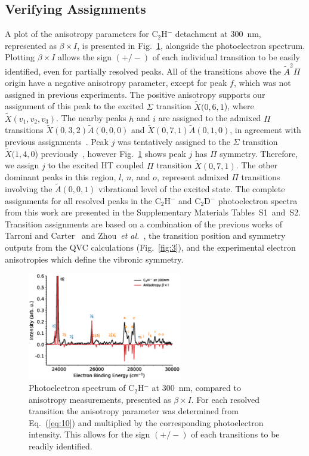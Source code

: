 \documentclass[aip,graphicx]{revtex4-1}
\begin{document}
\subsection{Verifying Assignments}
A plot of the anisotropy parameters for C$_2$H$^-$ detachment at 300~nm, represented as $\beta\times I$, is presented in Fig.~\ref{fig:6}, alongside the photoelectron spectrum. Plotting $\beta\times I$ allows the sign $(+/-)$ of each individual transition to be easily identified, even for partially resolved peaks. All of the transitions above the $\tilde{A} ^2\Pi$ origin have a negative anisotropy parameter, except for peak $f$, which was not assigned in previous experiments. The positive anisotropy supports our assignment of this peak to the excited $\Sigma$ transition $\tilde{X}(0,6,1$), where $\tilde{X}(v_1,v_2,v_3)$. The nearby peaks $h$ and $i$  are assigned to the admixed $\Pi$ transitions $\tilde{X}(0,3,2)\tilde{A}(0,0,0)$ and $\tilde{X}(0,7,1)\tilde{A}(0,1,0)$, in agreement with previous assignments~\cite{zho07,tar03}. Peak $j$ was tentatively assigned to the $\Sigma$ transition $\tilde{X}(1,4,0$) previously~\cite{zho07}, however Fig.~\ref{fig:6} shows peak $j$ has $\Pi$ symmetry. Therefore, we assign $j$ to the excited HT coupled $\Pi$ transition $\tilde{X}(0,7,1)$. The other dominant peaks in this region, $l$, $n$, and $o$, represent admixed $\Pi$ transitions involving the $\tilde{A}(0,0,1)$ vibrational level of the excited state. The complete assignments for all resolved peaks in the C$_2$H$^-$ and C$_2$D$^-$ photoelectron spectra from this work are presented in the Supplementary Materials Tables~S1~and~S2. Transition assignments are based on a combination of the previous works of Tarroni and Carter~\cite{tar03} and Zhou~\emph{et al.}~\cite{zho07}, the transition position and symmetry outputs from the QVC calculations (Fig.~\ref{fig:3}), and the experimental electron anisotropies which define the vibronic symmetry.

\begin{figure}[th!]
	\includegraphics[width=0.6\textwidth]{figures/Fig6}
	\caption{Photoelectron spectrum of C$_2$H$^-$ at 300~nm, compared to anisotropy measurements, presented as $\beta\times I$. For each resolved transition the anisotropy parameter was determined from Eq.~(\ref{eq:10}) and multiplied by the corresponding photoelectron intensity. This allows for the sign $(+/-)$ of each transitions to be readily identified.}
	\label{fig:6}
\end{figure}
\end{document}
